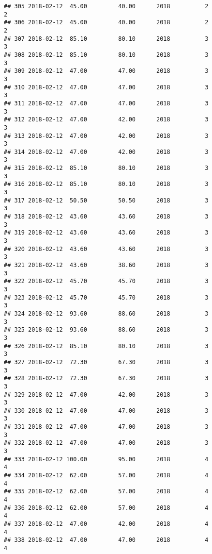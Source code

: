 \documentclass[]{article}
\begin{document}
\begin{verbatim}
## 305 2018-02-12  45.00         40.00      2018          2                 2
## 306 2018-02-12  45.00         40.00      2018          2                 2
## 307 2018-02-12  85.10         80.10      2018          3                 3
## 308 2018-02-12  85.10         80.10      2018          3                 3
## 309 2018-02-12  47.00         47.00      2018          3                 3
## 310 2018-02-12  47.00         47.00      2018          3                 3
## 311 2018-02-12  47.00         47.00      2018          3                 3
## 312 2018-02-12  47.00         42.00      2018          3                 3
## 313 2018-02-12  47.00         42.00      2018          3                 3
## 314 2018-02-12  47.00         42.00      2018          3                 3
## 315 2018-02-12  85.10         80.10      2018          3                 3
## 316 2018-02-12  85.10         80.10      2018          3                 3
## 317 2018-02-12  50.50         50.50      2018          3                 3
## 318 2018-02-12  43.60         43.60      2018          3                 3
## 319 2018-02-12  43.60         43.60      2018          3                 3
## 320 2018-02-12  43.60         43.60      2018          3                 3
## 321 2018-02-12  43.60         38.60      2018          3                 3
## 322 2018-02-12  45.70         45.70      2018          3                 3
## 323 2018-02-12  45.70         45.70      2018          3                 3
## 324 2018-02-12  93.60         88.60      2018          3                 3
## 325 2018-02-12  93.60         88.60      2018          3                 3
## 326 2018-02-12  85.10         80.10      2018          3                 3
## 327 2018-02-12  72.30         67.30      2018          3                 3
## 328 2018-02-12  72.30         67.30      2018          3                 3
## 329 2018-02-12  47.00         42.00      2018          3                 3
## 330 2018-02-12  47.00         47.00      2018          3                 3
## 331 2018-02-12  47.00         47.00      2018          3                 3
## 332 2018-02-12  47.00         47.00      2018          3                 3
## 333 2018-02-12 100.00         95.00      2018          4                 4
## 334 2018-02-12  62.00         57.00      2018          4                 4
## 335 2018-02-12  62.00         57.00      2018          4                 4
## 336 2018-02-12  62.00         57.00      2018          4                 4
## 337 2018-02-12  47.00         42.00      2018          4                 4
## 338 2018-02-12  47.00         47.00      2018          4                 4

\end{verbatim}
\end{document}
